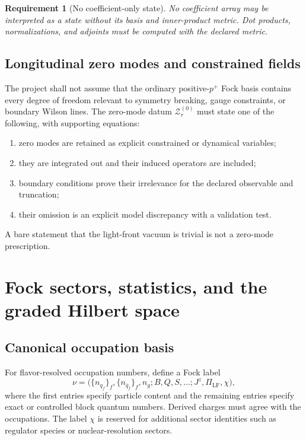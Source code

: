 \documentclass[11pt]{article}
\newtheorem{requirement}[definition]{Requirement}
\newcommand{\LF}{\mathrm{LF}}
\newcommand{\cZ}{\mathcal Z}
\begin{document}
\begin{requirement}[No coefficient-only state]
\label{req:no-coefficient-only}
No coefficient array may be interpreted as a state without its basis and
inner-product metric.  Dot products, normalizations, and adjoints must be
computed with the declared metric.
\end{requirement}

\subsection{Longitudinal zero modes and constrained fields}

The project shall not assume that the ordinary positive-\(p^+\) Fock basis
contains every degree of freedom relevant to symmetry breaking, gauge
constraints, or boundary Wilson lines.  The zero-mode datum
\(\cZ_r^{(0)}\) must state one of the following, with supporting equations:
\begin{enumerate}
\item zero modes are retained as explicit constrained or dynamical variables;
\item they are integrated out and their induced operators are included;
\item boundary conditions prove their irrelevance for the declared
observable and truncation;
\item their omission is an explicit model discrepancy with a validation test.
\end{enumerate}
A bare statement that the light-front vacuum is trivial is not a zero-mode
prescription.

\section{Fock sectors, statistics, and the graded Hilbert space}
\label{sec:fock-spaces}

\subsection{Canonical occupation basis}

For flavor-resolved occupation numbers, define a Fock label
\begin{equation}
 \nu=\bigl(
 \{n_{q_f}\}_f,\{n_{\bar q_f}\}_f,n_g;
 B,Q,S,\ldots;J^z,\Pi_{\LF},\chi
 \bigr),
\label{eq:fock-label}
\end{equation}
where the first entries specify particle content and the remaining entries
specify exact or controlled block quantum numbers.  Derived charges must
agree with the occupations.  The label \(\chi\) is reserved for additional
sector identities such as regulator species or nuclear-resolution sectors.
\end{document}
